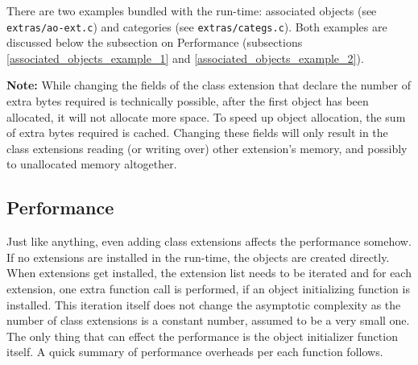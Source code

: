 There are two examples bundled with the run-time: associated objects (see \verb=extras/ao-ext.c=) and categories (see \texttt{extras/categs.c}). Both examples are discussed below the subsection on Performance (subsections \ref{associated_objects_example_1} and \ref{associated_objects_example_2}).

\textbf{Note:} While changing the fields of the class extension that declare the number of extra bytes required is technically possible, after the first object has been allocated, it will not allocate more space. To speed up object allocation, the sum of extra bytes required is cached. Changing these fields will only result in the class extensions reading (or writing over) other extension's memory, and possibly to unallocated memory altogether.

\subsection{Performance}
Just like anything, even adding class extensions affects the performance somehow. If no extensions are installed in the run-time, the objects are created directly. When extensions get installed, the extension list needs to be iterated and for each extension, one extra function call is performed, if an object initializing function is installed. This iteration itself does not change the asymptotic complexity as the number of class extensions is a constant number, assumed to be a very small one. The only thing that can effect the performance is the object initializer function itself. A quick summary of performance overheads per each function follows.

